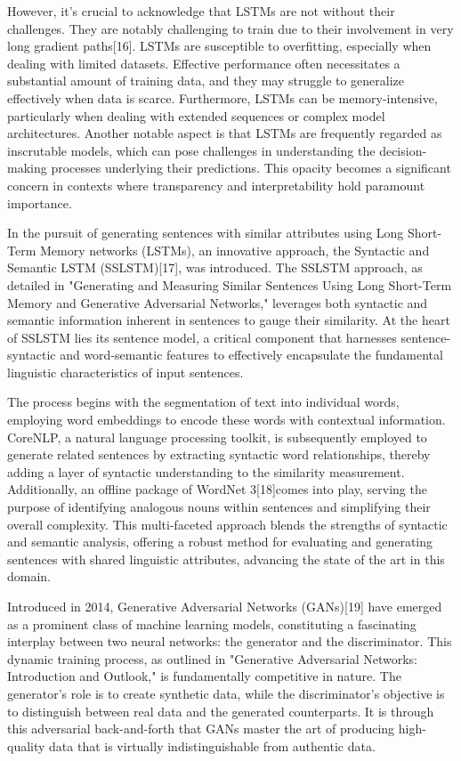 \documentclass[conference]{IEEEtran}
\begin{document}
However, it's crucial to acknowledge that LSTMs are not without their challenges. They are notably challenging to train due to their involvement in very long gradient paths[16]. LSTMs are susceptible to overfitting, especially when dealing with limited datasets. Effective performance often necessitates a substantial amount of training data, and they may struggle to generalize effectively when data is scarce. Furthermore, LSTMs can be memory-intensive, particularly when dealing with extended sequences or complex model architectures. Another notable aspect is that LSTMs are frequently regarded as inscrutable models, which can pose challenges in understanding the decision-making processes underlying their predictions. This opacity becomes a significant concern in contexts where transparency and interpretability hold paramount importance.



In the pursuit of generating sentences with similar attributes using Long Short-Term Memory networks (LSTMs), an innovative approach, the Syntactic and Semantic LSTM (SSLSTM)[17], was introduced. The SSLSTM approach, as detailed in "Generating and Measuring Similar Sentences Using Long Short-Term Memory and Generative Adversarial Networks," leverages both syntactic and semantic information inherent in sentences to gauge their similarity. At the heart of SSLSTM lies its sentence model, a critical component that harnesses sentence-syntactic and word-semantic features to effectively encapsulate the fundamental linguistic characteristics of input sentences.


The process begins with the segmentation of text into individual words, employing word embeddings to encode these words with contextual information. CoreNLP, a natural language processing toolkit, is subsequently employed to generate related sentences by extracting syntactic word relationships, thereby adding a layer of syntactic understanding to the similarity measurement. Additionally, an offline package of WordNet 3[18]comes into play, serving the purpose of identifying analogous nouns within sentences and simplifying their overall complexity. This multi-faceted approach blends the strengths of syntactic and semantic analysis, offering a robust method for evaluating and generating sentences with shared linguistic attributes, advancing the state of the art in this domain.



Introduced in 2014, Generative Adversarial Networks (GANs)[19] have emerged as a prominent class of machine learning models, constituting a fascinating interplay between two neural networks: the generator and the discriminator. This dynamic training process, as outlined in "Generative Adversarial Networks: Introduction and Outlook," is fundamentally competitive in nature. The generator's role is to create synthetic data, while the discriminator's objective is to distinguish between real data and the generated counterparts. It is through this adversarial back-and-forth that GANs master the art of producing high-quality data that is virtually indistinguishable from authentic data.
\end{document}
